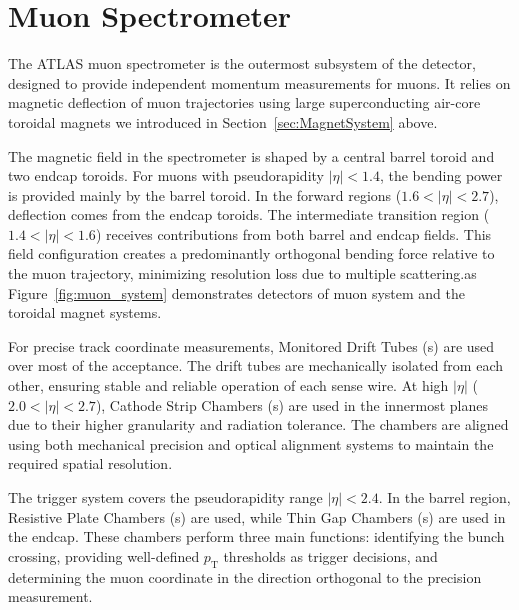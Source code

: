 \section{Muon Spectrometer} \label{sec:MuonSpectrometer}
The ATLAS muon spectrometer is the outermost subsystem of the detector, designed to provide independent momentum measurements for muons. It relies on magnetic deflection of muon trajectories using large superconducting air-core toroidal magnets we introduced in Section~\ref{sec:MagnetSystem} above.

The magnetic field in the spectrometer is shaped by a central barrel toroid and two endcap toroids. For muons with pseudorapidity $|\eta| < 1.4$, the bending power is provided mainly by the barrel toroid. In the forward regions ($1.6 < |\eta| < 2.7$), deflection comes from the endcap toroids. The intermediate transition region ($1.4 < |\eta| < 1.6$) receives contributions from both barrel and endcap fields. This field configuration creates a predominantly orthogonal bending force relative to the muon trajectory, minimizing resolution loss due to multiple scattering.as Figure~\ref{fig:muon_system} demonstrates detectors of muon system and the toroidal magnet systems.

For precise track coordinate measurements, Monitored Drift Tubes ({\MDT}s) are used over most of the acceptance. The drift tubes are mechanically isolated from each other, ensuring stable and reliable operation of each sense wire. At high $|\eta|$ ($2.0 < |\eta| < 2.7$), Cathode Strip Chambers ({\CSC}s) are used in the innermost planes due to their higher granularity and radiation tolerance. The chambers are aligned using both mechanical precision and optical alignment systems to maintain the required spatial resolution. 

The trigger system covers the pseudorapidity range $|\eta| < 2.4$. In the barrel region, Resistive Plate Chambers ({\RPC}s) are used, while Thin Gap Chambers ({\TGC}s) are used in the endcap. These chambers perform three main functions: identifying the bunch crossing, providing well-defined $p_\mathrm{T}$ thresholds as trigger decisions, and determining the muon coordinate in the direction orthogonal to the precision measurement.

